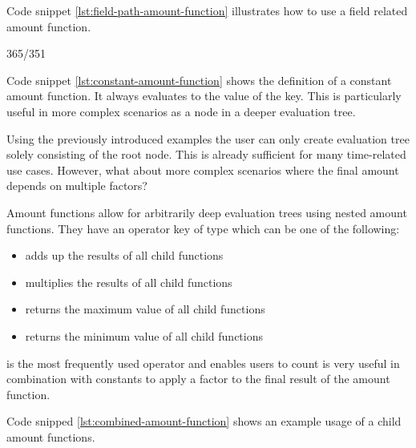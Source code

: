 Code snippet \ref{lst:field-path-amount-function} illustrates how to use a field related amount function.


365/351



Code snippet \ref{lst:constant-amount-function} shows the definition of a constant amount function.
It always evaluates to the value of the  key.
This is particularly useful in more complex scenarios as a node in a deeper evaluation tree.



Using the previously introduced examples the user can only create evaluation tree solely consisting of the root node.
This is already sufficient for many time-related use cases.
However, what about more complex scenarios where the final amount depends on multiple factors?

Amount functions allow for arbitrarily deep evaluation trees using nested amount functions.
They have an operator key of type  which can be one of the following:
\begin{itemize}
    \item {} adds up the results of all child functions
    \item {} multiplies the results of all child functions
    \item {} returns the maximum value of all child functions
    \item {} returns the minimum value of all child functions
\end{itemize}

 is the most frequently used operator and enables users to count
 is very useful in combination with constants to apply a factor to the final result of the amount function.

Code snipped \ref{lst:combined-amount-function} shows an example usage of a child amount functions.



